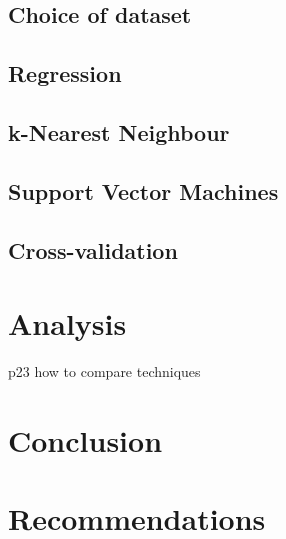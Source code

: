 \documentclass[10pt,a4paper]{article}
\begin{document}
\subsection{Choice of dataset}



\subsection{Regression}

\subsection{k-Nearest Neighbour}

\subsection{Support Vector Machines}

\subsection{Cross-validation}

\section{Analysis}


\cite{Murphy} p23 how to compare techniques
\section{Conclusion}

\section{Recommendations}



\appendix
\appendixpage
\end{document}
